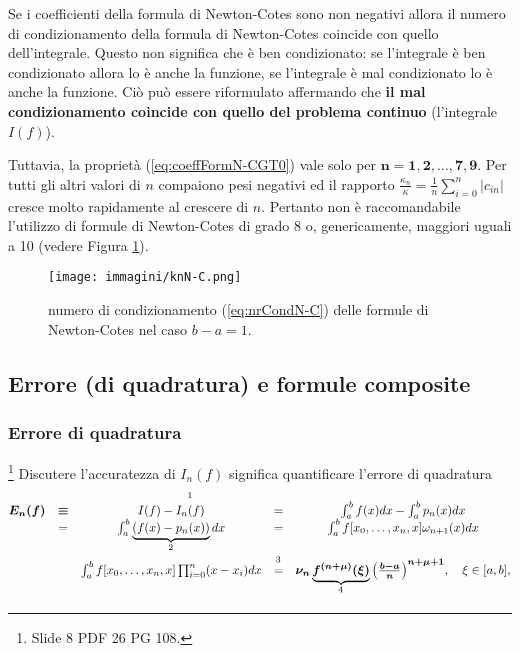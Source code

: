 
Se i coefficienti della formula di Newton-Cotes sono non negativi allora il numero di condizionamento della formula di Newton-Cotes coincide con quello dell'integrale. Questo non significa che è ben condizionato: se l'integrale è ben condizionato allora lo è anche la funzione, se l'integrale è mal condizionato lo è anche la funzione. Ciò può essere riformulato affermando che \textbf{il mal condizionamento coincide con quello del problema continuo} (l'integrale $I(f)$).

Tuttavia, la proprietà (\ref{eq:coeffFormN-CGT0}) vale solo per $\boldsymbol{n=1,2,\hdots,7,9}$. Per tutti gli altri valori di $n$ compaiono pesi negativi ed il rapporto $\frac{\kappa_n}{\kappa}=\frac{1}{n}\sum_{i=0}^n|c_{in}|$ cresce molto rapidamente al crescere di $n$. Pertanto non è raccomandabile l'utilizzo di formule di Newton-Cotes di grado 8 o, genericamente, maggiori uguali a 10 (vedere Figura \ref{fig:knN-C}).

\begin{figure}[H]
    \centering
    \texttt{[image: immagini/knN-C.png]}
    \caption{numero di condizionamento (\ref{eq:nrCondN-C}) delle formule di Newton-Cotes nel caso $b-a=1$.}\label{fig:knN-C}
\end{figure}

\subsection{Errore (di quadratura) e formule composite}
\subsubsection{Errore di quadratura}
\footnote{Slide 8 PDF 26 PG 108.} Discutere l'accuratezza di $I_n(f)$ significa quantificare l'errore di quadratura
\begin{equation}\label{eq:errQuadr}
    \begin{matrix}
        \boldsymbol{E_n(f)}&\boldsymbol{\equiv}& I(f)-\overset{\footnotemark}{I_n(f)}&=&\int_a^b f(x)dx-\int_a^bp_n(x)dx\\
        &=&\int_a^b\underbrace{(f(x)-p_n(x))}_{\footnotemark}dx&=&\int_a^bf[x_0,\hdots,x_n,x]\omega_{n+1}(x)dx\\
        &&\int_a^bf[x_0,\hdots,x_n,x]\prod_{i=0}^n(x-x_i)dx&\overset{\footnotemark}{=}&\boldsymbol{\nu_n} \underbrace{\boldsymbol{f^{(n+\mu)}(\xi)}}_{\footnotemark}\boldsymbol{\left(\frac{b-a}{n}\right)^{n+\mu+1}},\quad\xi\in [a,b],
    \end{matrix}
\end{equation}
\addtocounter{footnote}{-3}

